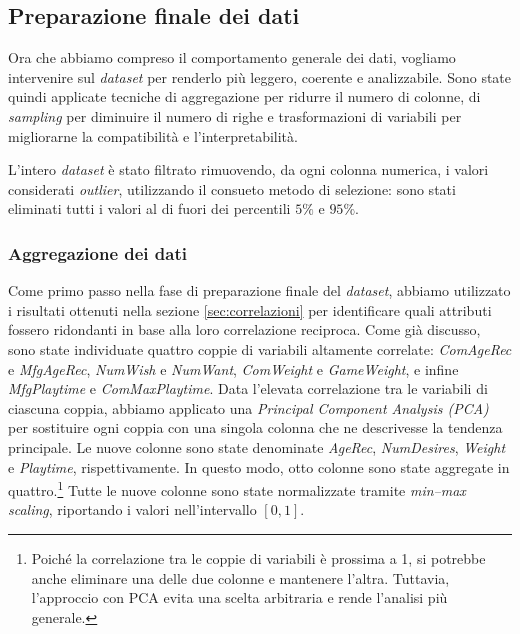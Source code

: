 \documentclass[10pt,twocolumn]{article}
\begin{document}
\subsection{Preparazione finale dei dati}
\label{sec:prep}

Ora che abbiamo compreso il comportamento generale dei dati, vogliamo intervenire sul \textit{dataset} per renderlo più leggero, coerente e analizzabile. 
Sono state quindi applicate tecniche di aggregazione per ridurre il numero di colonne, di \textit{sampling} per diminuire il numero di righe e trasformazioni di variabili per migliorarne la compatibilità e l’interpretabilità.

\smallskip

L’intero \textit{dataset} è stato filtrato rimuovendo, da ogni colonna numerica, i valori considerati \textit{outlier}, utilizzando il consueto metodo di selezione: sono stati eliminati tutti i valori al di fuori dei percentili $5\%$ e $95\%$.

\subsubsection{Aggregazione dei dati}
\label{sec:aggr}

Come primo passo nella fase di preparazione finale del \textit{dataset}, abbiamo utilizzato i risultati ottenuti nella sezione \ref{sec:correlazioni} per identificare quali attributi fossero ridondanti in base alla loro correlazione reciproca. 
Come già discusso, sono state individuate quattro coppie di variabili altamente correlate: \textit{ComAgeRec} e \textit{MfgAgeRec}, \textit{NumWish} e \textit{NumWant}, \textit{ComWeight} e \textit{GameWeight}, e infine \textit{MfgPlaytime} e \textit{ComMaxPlaytime}. 
Data l’elevata correlazione tra le variabili di ciascuna coppia, abbiamo applicato una \textit{Principal Component Analysis (PCA)} per sostituire ogni coppia con una singola colonna che ne descrivesse la tendenza principale. 
Le nuove colonne sono state denominate \textit{AgeRec}, \textit{NumDesires}, \textit{Weight} e \textit{Playtime}, rispettivamente. 
In questo modo, otto colonne sono state aggregate in quattro.\footnote{Poiché la correlazione tra le coppie di variabili è prossima a 1, si potrebbe anche eliminare una delle due colonne e mantenere l’altra. Tuttavia, l’approccio con PCA evita una scelta arbitraria e rende l’analisi più generale.}
Tutte le nuove colonne sono state normalizzate tramite \textit{min–max scaling}, riportando i valori nell’intervallo $[0,1]$.
\end{document}
